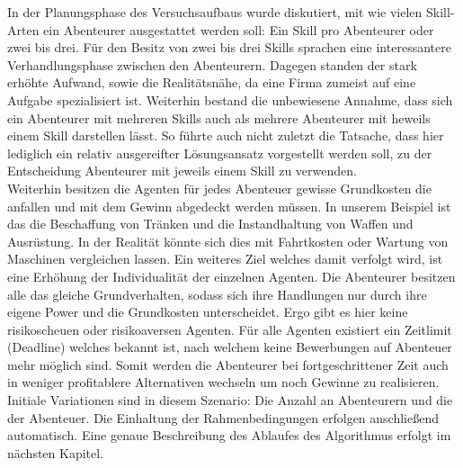 \documentclass[fleqn,10pt]{SelfArx} %
\begin{document}
In der Planungsphase des Versuchsaufbaus wurde diskutiert, mit wie vielen Skill-Arten ein Abenteurer ausgestattet werden soll: Ein Skill pro Abenteurer oder zwei bis drei. Für den Besitz von zwei bis drei Skills sprachen eine interessantere Verhandlungsphase zwischen den Abenteurern. Dagegen standen der stark erhöhte Aufwand, sowie die Realitätsnähe, da eine Firma zumeist auf eine Aufgabe spezialisiert ist. Weiterhin bestand die unbewiesene Annahme, dass sich ein Abenteurer mit mehreren Skills auch als mehrere Abenteurer mit heweils einem Skill darstellen lässt. So führte auch nicht zuletzt die Tatsache, dass hier lediglich ein relativ ausgereifter Lösungsansatz vorgestellt werden soll, zu der Entscheidung Abenteurer mit jeweils einem Skill zu verwenden. \\
Weiterhin besitzen die Agenten für jedes Abenteuer gewisse Grundkosten die anfallen und mit dem Gewinn abgedeckt werden müssen. In unserem Beispiel ist das die Beschaffung von Tränken und die Instandhaltung von Waffen und Ausrüstung. In der Realität könnte sich dies mit Fahrtkosten oder Wartung von Maschinen vergleichen lassen. Ein weiteres Ziel welches damit verfolgt wird, ist eine Erhöhung der Individualität der einzelnen Agenten. Die Abenteurer besitzen alle das gleiche Grundverhalten, sodass sich ihre Handlungen nur durch ihre eigene Power und die Grundkosten unterscheidet. Ergo gibt es hier keine risikoscheuen oder risikoaversen Agenten. Für alle Agenten existiert ein Zeitlimit (Deadline) welches bekannt ist, nach welchem keine Bewerbungen auf Abenteuer mehr möglich sind. Somit werden die Abenteurer bei fortgeschrittener Zeit auch in weniger profitablere Alternativen wechseln um noch Gewinne zu realisieren.\\
Initiale Variationen sind in diesem Szenario: Die Anzahl an Abenteurern und die der Abenteuer. Die Einhaltung der Rahmenbedingungen erfolgen anschließend automatisch. Eine genaue Beschreibung des Ablaufes des Algorithmus erfolgt im nächsten Kapitel.\\


\end{document}
